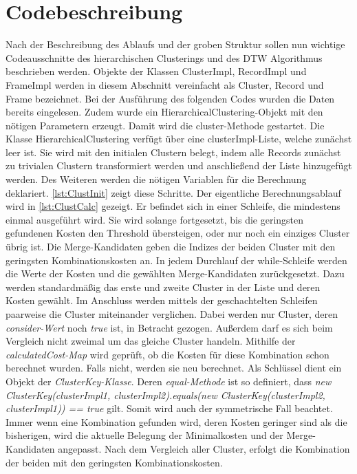 \section{Codebeschreibung}
\label{5-Codebeschreibung}
Nach der Beschreibung des Ablaufs und der groben Struktur
sollen nun wichtige Codeausschnitte des hierarchischen Clusterings
und des \ac{DTW} Algorithmus beschrieben werden.
Objekte der Klassen ClusterImpl, RecordImpl und FrameImpl werden in diesem Abschnitt
vereinfacht als Cluster, Record und Frame bezeichnet.
Bei der Ausführung des folgenden Codes wurden die Daten bereits eingelesen.
Zudem wurde ein HierarchicalClustering-Objekt mit den nötigen Parametern erzeugt.
Damit wird die cluster-Methode gestartet.
Die Klasse HierarchicalClustering verfügt über eine clusterImpl-Liste,
welche zunächst leer ist.
Sie wird mit den initialen Clustern belegt,
indem alle Records zunächst zu trivialen Clustern transformiert werden
und anschließend der Liste hinzugefügt werden.
Des Weiteren werden die nötigen Variablen für die Berechnung deklariert.
\autoref{lst:ClustInit} zeigt diese Schritte.
Der eigentliche Berechnungsablauf wird in \autoref{lst:ClustCalc} gezeigt.
Er befindet sich in einer Schleife, die mindestens einmal ausgeführt wird.
Sie wird solange fortgesetzt, bis die geringsten gefundenen Kosten den Threshold übersteigen,
oder nur noch ein einziges Cluster übrig ist.
Die Merge-Kandidaten geben die Indizes der beiden Cluster mit den
geringsten Kombinationskosten an.
In jedem Durchlauf der while-Schleife werden die Werte der Kosten
und die gewählten Merge-Kandidaten zurückgesetzt.
Dazu werden standardmäßig das erste und zweite Cluster in der Liste und deren Kosten gewählt.
Im Anschluss werden mittels der geschachtelten Schleifen paarweise die Cluster miteinander verglichen.
Dabei werden nur Cluster, deren \emph{consider-Wert} noch \emph{true} ist, in Betracht gezogen.
Außerdem darf es sich beim Vergleich nicht zweimal um das gleiche Cluster handeln.
Mithilfe der \emph{calculatedCost-Map} wird geprüft, ob die Kosten für diese Kombination schon berechnet wurden.
Falls nicht, werden sie neu berechnet.
Als Schlüssel dient ein Objekt der \emph{ClusterKey-Klasse}.
Deren \emph{equal-Methode} ist so definiert,
dass \emph{new ClusterKey(clusterImpl1, clusterImpl2).equals(new ClusterKey(clusterImpl2, clusterImpl1)) == true} gilt.
Somit wird auch der symmetrische Fall beachtet.
Immer wenn eine Kombination gefunden wird, deren Kosten geringer sind als die bisherigen,
wird die aktuelle Belegung der Minimalkosten und der Merge-Kandidaten angepasst.
Nach dem Vergleich aller Cluster, erfolgt die Kombination der beiden mit den geringsten Kombinationskosten.
